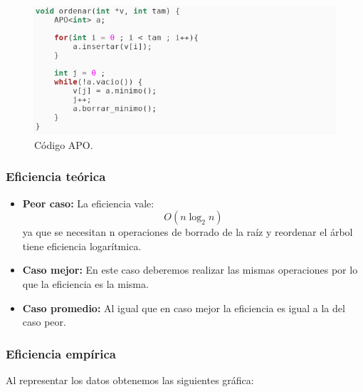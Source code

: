 \begin{figure}[H]
        \includegraphics[scale=0.7]{imagenes/apo.png}
        \caption{Código APO.}
        \label{fig21}
\end{figure}

\subsubsection{Eficiencia teórica}

\begin{itemize}
  \item \textbf{Peor caso:} La eficiencia vale:
  \begin{equation} O(n \log_2n ) \end{equation}
  ya que se necesitan n operaciones de borrado de la raíz y reordenar el árbol tiene eficiencia logarítmica.
  \item \textbf{Caso mejor:} En este caso deberemos realizar las mismas operaciones por lo que la eficiencia es la misma.
  \item \textbf{Caso promedio:} Al igual que en caso mejor la eficiencia es igual a la del caso peor.
\end{itemize}

\subsubsection{Eficiencia empírica}

Al representar los datos obtenemos las siguientes gráfica:

